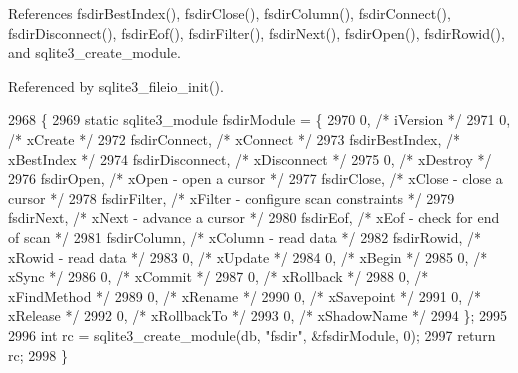 References fsdir\+Best\+Index(), fsdir\+Close(), fsdir\+Column(), fsdir\+Connect(), fsdir\+Disconnect(), fsdir\+Eof(), fsdir\+Filter(), fsdir\+Next(), fsdir\+Open(), fsdir\+Rowid(), and sqlite3\+\_\+create\+\_\+module.



Referenced by sqlite3\+\_\+fileio\+\_\+init().


\begin{DoxyCode}
2968                                      \{
2969   \textcolor{keyword}{static} sqlite3_module fsdirModule = \{
2970     0,                         \textcolor{comment}{/* iVersion */}
2971     0,                         \textcolor{comment}{/* xCreate */}
2972     fsdirConnect,              \textcolor{comment}{/* xConnect */}
2973     fsdirBestIndex,            \textcolor{comment}{/* xBestIndex */}
2974     fsdirDisconnect,           \textcolor{comment}{/* xDisconnect */}
2975     0,                         \textcolor{comment}{/* xDestroy */}
2976     fsdirOpen,                 \textcolor{comment}{/* xOpen - open a cursor */}
2977     fsdirClose,                \textcolor{comment}{/* xClose - close a cursor */}
2978     fsdirFilter,               \textcolor{comment}{/* xFilter - configure scan constraints */}
2979     fsdirNext,                 \textcolor{comment}{/* xNext - advance a cursor */}
2980     fsdirEof,                  \textcolor{comment}{/* xEof - check for end of scan */}
2981     fsdirColumn,               \textcolor{comment}{/* xColumn - read data */}
2982     fsdirRowid,                \textcolor{comment}{/* xRowid - read data */}
2983     0,                         \textcolor{comment}{/* xUpdate */}
2984     0,                         \textcolor{comment}{/* xBegin */}
2985     0,                         \textcolor{comment}{/* xSync */}
2986     0,                         \textcolor{comment}{/* xCommit */}
2987     0,                         \textcolor{comment}{/* xRollback */}
2988     0,                         \textcolor{comment}{/* xFindMethod */}
2989     0,                         \textcolor{comment}{/* xRename */}
2990     0,                         \textcolor{comment}{/* xSavepoint */}
2991     0,                         \textcolor{comment}{/* xRelease */}
2992     0,                         \textcolor{comment}{/* xRollbackTo */}
2993     0,                         \textcolor{comment}{/* xShadowName */}
2994   \};
2995 
2996   \textcolor{keywordtype}{int} rc = sqlite3_create_module(db, \textcolor{stringliteral}{"fsdir"}, &fsdirModule, 0);
2997   \textcolor{keywordflow}{return} rc;
2998 \}
\end{DoxyCode}
\mbox{\label{shell_8c_ab31974a8f0b2cc8277d7a473784266d0}} 
